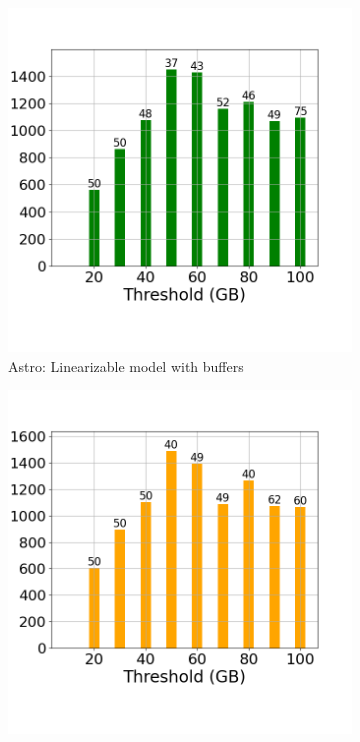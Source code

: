 \begin{figure}
	\centering
	\begin{subfigure}[c]{0.48\textwidth}
		\includegraphics[width=1\textwidth]   {figures/Experiments/Dynamic/ASTRO/Batch_processing/50/average_query_time_per_batch_version_999777015_10485760_10_delay[50].png}
		\caption{Astro: Linearizable model with buffers}
		\label{fig:logical-ts-50-astro}
	\end{subfigure}
	\begin{subfigure}[c]{0.48\textwidth}
		\includegraphics[width=1\textwidth]	 {figures/Experiments/Dynamic/ASTRO/Batch_processing/50/average_query_time_per_batch_version_999777018_10485760_10_delay[50].png}

\end{subfigure}
\end{figure}
